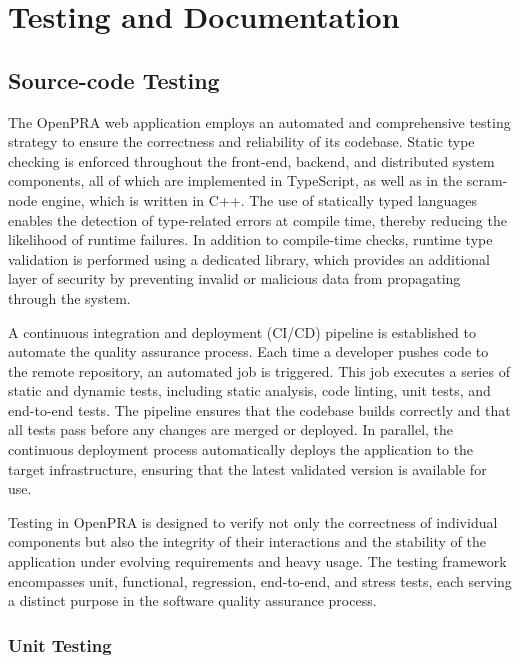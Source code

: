 \section{Testing and Documentation}
\label{sec:testing_and_documentation}

\subsection{Source-code Testing}

The OpenPRA web application employs an automated and comprehensive testing strategy to ensure the correctness and reliability of its codebase. Static type checking is enforced throughout the front-end, backend, and distributed system components, all of which are implemented in TypeScript, as well as in the scram-node engine, which is written in C++. The use of statically typed languages enables the detection of type-related errors at compile time, thereby reducing the likelihood of runtime failures. In addition to compile-time checks, runtime type validation is performed using a dedicated library, which provides an additional layer of security by preventing invalid or malicious data from propagating through the system.

A continuous integration and deployment (CI/CD) pipeline is established to automate the quality assurance process. Each time a developer pushes code to the remote repository, an automated job is triggered. This job executes a series of static and dynamic tests, including static analysis, code linting, unit tests, and end-to-end tests. The pipeline ensures that the codebase builds correctly and that all tests pass before any changes are merged or deployed. In parallel, the continuous deployment process automatically deploys the application to the target infrastructure, ensuring that the latest validated version is available for use.

Testing in OpenPRA is designed to verify not only the correctness of individual components but also the integrity of their interactions and the stability of the application under evolving requirements and heavy usage. The testing framework encompasses unit, functional, regression, end-to-end, and stress tests, each serving a distinct purpose in the software quality assurance process.

\subsubsection{Unit Testing}

